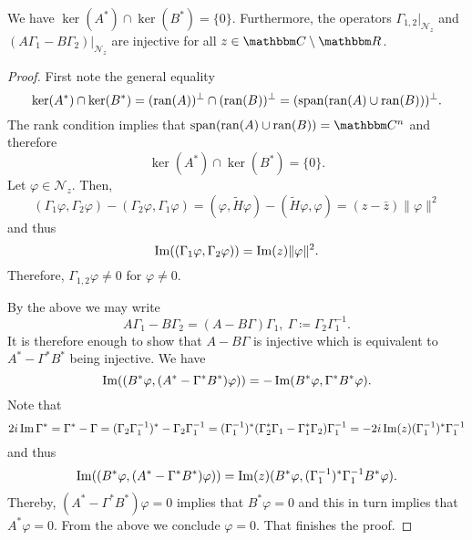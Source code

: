 \begin{lemma}\label{abc01t}
We have $\ker(A^*)\cap\ker(B^*)=\{0\}$. Furthermore, the operators
$\Gamma_{1,2}|_{\mathcal{N}_z}$ and $(A\Gamma_1-B\Gamma_2)|_{\mathcal{N}_z}$ are
injective for all $z\in\C\setminus\R$.
\end{lemma}
\begin{proof}
First note the general equality
\begin{equation*}
  \ker(A^*)\cap\ker(B^*) = (\operatorname{ran}(A))^\perp \cap (\operatorname{ran}(B))^\perp = ( \operatorname{span}(\operatorname{ran}(A)\cup\operatorname{ran}(B)) )^\perp .
\end{equation*}
The rank condition implies that $\mathspan(\ran(A)\cup\ran(B))=\C^n$ and therefore
\begin{equation*}
  \ker(A^*)\cap\ker(B^*) = \{ 0 \} .
\end{equation*}
Let $\varphi\in\mathcal{N}_z$. Then,
\begin{equation*}
 (\Gamma_1\varphi,\Gamma_2\varphi)-(\Gamma_2\varphi,\Gamma_1\varphi)
    = (\varphi,\tilde H\varphi) - (\tilde H\varphi,\varphi)
    = (z-\bar z) \|\varphi\|^2
\end{equation*}
and thus
\begin{equation*}
  \operatorname{Im}( (\Gamma_1\varphi,\Gamma_2\varphi) ) = \operatorname{Im}(z) \|\varphi\|^2 .
\end{equation*}
Therefore, $\Gamma_{1,2}\varphi\neq 0$ for $\varphi\neq 0$.

By the above we may write
\begin{equation*}
  A\Gamma_1-B\Gamma_2 = (A-B\Gamma) \Gamma_1,\ \Gamma\coloneqq\Gamma_2\Gamma_1^{-1} .
\end{equation*}
It is therefore enough to show that $A-B\Gamma$ is injective which is equivalent to
$A^*-\Gamma^*B^*$ being injective. We have 
\begin{equation*}
  \operatorname{Im}( (B^*\varphi,(A^*-\Gamma^* B^*)\varphi) ) = - \operatorname{Im}( B^*\varphi, \Gamma^* B^*\varphi) .
\end{equation*}
Note that
\begin{equation*}
  2i \operatorname{Im} \Gamma^*
   = \Gamma^*- \Gamma
   = (\Gamma_2\Gamma_1^{-1})^* -\Gamma_2\Gamma_1^{-1}
   = (\Gamma_1^{-1})^* ( \Gamma_2^*\Gamma_1 - \Gamma_1^*\Gamma_2 ) \Gamma_1^{-1}
   = - 2i \operatorname{Im}(z) (\Gamma_1^{-1})^* \Gamma_1^{-1}
\end{equation*}
and thus
\begin{equation*}
  \operatorname{Im}( (B^*\varphi,(A^*-\Gamma^* B^*)\varphi) ) = \operatorname{Im}(z) (B^*\varphi, (\Gamma_1^{-1})^* \Gamma_1^{-1} B^*\varphi) .
\end{equation*}
Thereby, $(A^*-\Gamma^*B^*)\varphi=0$ implies that $B^*\varphi=0$ and this in turn implies that $A^*\varphi=0$.
From the above we conclude $\varphi=0$. That finishes the proof.
\end{proof}

